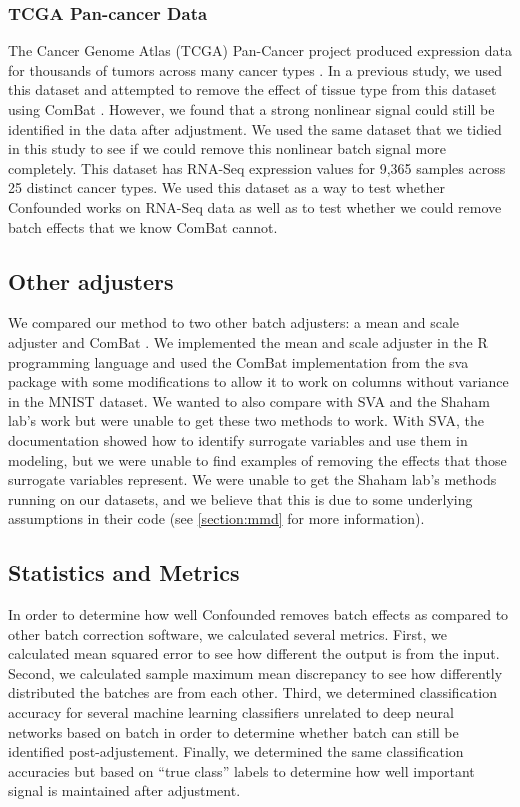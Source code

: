 \documentclass[notitlepage]{article}
\begin{document}
\subsubsection{TCGA Pan-cancer Data}

The Cancer Genome Atlas (TCGA) Pan-Cancer project produced expression data for thousands of tumors across many cancer types \cite{the_cancer_genome_atlas_research_network_cancer_2013}.
In a previous study, we used this dataset and attempted to remove the effect of tissue type from this dataset using ComBat \cite{dayton_classifying_2017-1}.
However, we found that a strong nonlinear signal could still be identified in the data after adjustment.
We used the same dataset that we tidied in this study to see if we could remove this nonlinear batch signal more completely.
This dataset has RNA-Seq expression values for 9,365 samples across 25 distinct cancer types.
We used this dataset as a way to test whether Confounded works on RNA-Seq data as well as to test whether we could remove batch effects that we know ComBat cannot.

\subsection{Other adjusters}

We compared our method to two other batch adjusters: a mean and scale adjuster and ComBat \cite{johnson_adjusting_2007}.
We implemented the mean and scale adjuster in the R programming language \cite{r_core_team_r_2014} and used the ComBat implementation from the sva package \cite{leek_sva_2017} with some modifications to allow it to work on columns without variance in the MNIST dataset.
We wanted to also compare with SVA \cite{leek_capturing_2007} and the Shaham lab's work \cite{shaham_removal_2017,shaham_batch_2018} but were unable to get these two methods to work.
With SVA, the documentation showed how to identify surrogate variables and use them in modeling, but we were unable to find examples of removing the effects that those surrogate variables represent.
We were unable to get the Shaham lab's methods running on our datasets, and we believe that this is due to some underlying assumptions in their code (see \ref{section:mmd} for more information).

\subsection{Statistics and Metrics}

In order to determine how well Confounded removes batch effects as compared to other batch correction software, we calculated several metrics.
First, we calculated mean squared error to see how different the output is from the input.
Second, we calculated sample maximum mean discrepancy to see how differently distributed the batches are from each other.
Third, we determined classification accuracy for several machine learning classifiers unrelated to deep neural networks based on batch in order to determine whether batch can still be identified post-adjustement.
Finally, we determined the same classification accuracies but based on ``true class'' labels to determine how well important signal is maintained after adjustment.
\end{document}

